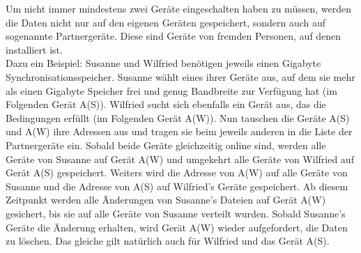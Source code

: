 Um nicht immer mindestens zwei Geräte eingeschalten haben zu müssen, werden die Daten nicht nur auf den eigenen Geräten gespeichert, sondern auch auf sogenannte Partnergeräte. Diese sind Geräte von fremden Personen, auf denen \sblit installiert ist. \\
Dazu ein Beispiel: Susanne und Wilfried benötigen jeweils einen Gigabyte Synchronisationsspeicher. Susanne wählt eines ihrer Geräte aus, auf dem sie mehr als einen Gigabyte Speicher frei und genug Bandbreite zur Verfügung hat (im Folgenden Gerät A(S)). Wilfried sucht sich ebenfalls ein Gerät aus, das die Bedingungen erfüllt (im Folgenden Gerät A(W)). Nun tauschen die Geräte A(S) und A(W) ihre Adressen aus und tragen sie beim jeweils anderen in die Liste der Partnergeräte ein. Sobald beide Geräte gleichzeitig online sind, werden alle Geräte von Susanne auf Gerät A(W) und umgekehrt alle Geräte von Wilfried auf Gerät A(S) gespeichert. Weiters wird die Adresse von A(W) auf alle Geräte von Susanne und die Adresse von A(S) auf Wilfried's Geräte gespeichert. Ab diesem Zeitpunkt werden alle Änderungen von Susanne's Dateien auf Gerät A(W) gesichert, bis sie auf alle Geräte von Susanne verteilt wurden. Sobald Susanne's Geräte die Änderung erhalten, wird Gerät A(W) wieder aufgefordert, die Daten zu löschen. Das gleiche gilt natürlich auch für Wilfried und das Gerät A(S). 